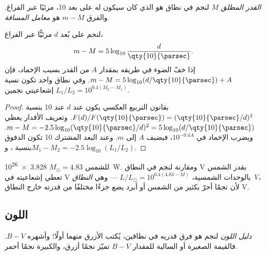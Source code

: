 \begin{definition}\label{def:b1:observing-the-sky:absolute}
\emph{القدر المطلق} $M$ لنجم في نطاق هو  الذي كان سيكون له على بعد \qty{10}{\parsec}، مرئيًا عبر الفراغ. والفرق $m - M$ هو \emph{معامل المسافة}.
\end{definition}

\begin{proposition}\label{prop:b1:observing-the-sky:modulus}
لنجم على بُعد $d$ مرئيًّا عبر الفراغ،
\[
  m - M = 5\log_{10}\frac{d}{\qty{10}{\parsec}} .
\]
إذا خفّ الضوء في طريقه بمقدار $A$ من القدر بسبب الإخماد، فإن $m - M = 5\log_{10}(d/\qty{10}{\parsec}) + A$. وفي نطاق واحد تكون نسبة إشعاعيتي نجمين $L_1/L_2 = 10^{0.4(M_2 - M_1)}$.
\end{proposition}

\begin{proof}
بقانون التربيع العكسي يكون  عند $d$  عند \qty{10}{\parsec} بنسبة $F(d)/F(\qty{10}{\parsec}) = (\qty{10}{\parsec}/d)^2$. وتعريف الأقدار يعطي $m - M = -2.5\log_{10}(\qty{10}{\parsec}/d)^2
= 5\log_{10}(d/\qty{10}{\parsec})$. ويضرب الإخماد  في $10^{-0.4A}$، فيضيف $A$ إلى $m$. وعند البعد المشترك \qty{10}{\parsec} تكون الدفوق بنسبة ، و$M_1 - M_2 = -2.5\log_{10}(L_1/L_2)$.
\end{proof}

للشمس  $M_\odot = 4.83$  \qty{3.828e26}{W}. ومقارنة  لنجم في النطاق V بقدر الشمس تعطي إشعاعيته في V بالوحدات الشمسية، $L/L_\odot = 10^{0.4(4.83 - M)}$ --- وهي  \emph{النطاق V}، لأن نجمًا أحرّ بكثير من الشمس أو أبرد يضع جزءًا مختلفًا من قدرته خارج النطاق V.

\subsection*{اللون}

\begin{definition}\label{def:b1:observing-the-sky:colour-index}
\emph{دليل اللون} لنجم هو فرق قدريه في نطاقين، يُكتب الأزرق منهما أولًا؛ وأشهره $B - V$. فالقيمة الصغيرة أو السالبة للمقدار $B - V$ تميّز نجمًا أزرق، والكبيرة نجمًا أحمر.
\end{definition}

